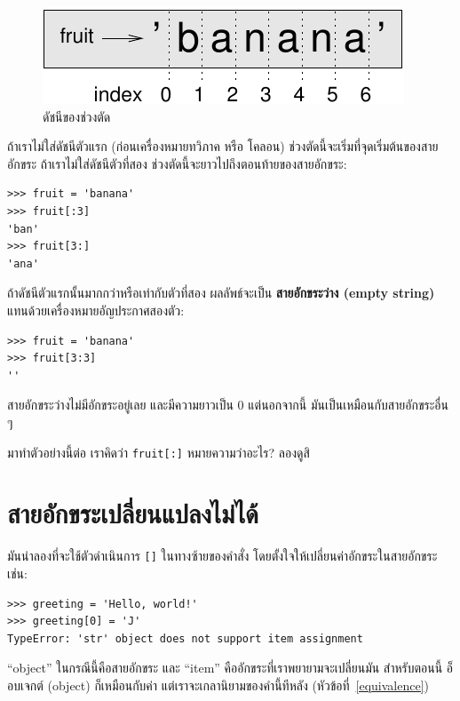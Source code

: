 \begin{figure}
\centerline
{\includegraphics[scale=0.8]{figs/banana.pdf}}
\caption{ดัชนีของช่วงตัด}
\label{fig.banana}
\end{figure}

ถ้าเราไม่ใส่ดัชนีตัวแรก (ก่อนเครื่องหมายทวิภาค หรือ โคลอน) ช่วงตัดนี้จะเริ่มที่จุดเริ่มต้นของสายอักขระ
ถ้าเราไม่ใส่ดัชนีตัวที่สอง ช่วงตัดนี้จะยาวไปถึงตอนท้ายของสายอักขระ:

\begin{verbatim}
>>> fruit = 'banana'
>>> fruit[:3]
'ban'
>>> fruit[3:]
'ana'
\end{verbatim}
%
ถ้าดัชนีตัวแรกนั้นมากกว่าหรือเท่ากับตัวที่สอง ผลลัพธ์จะเป็น {\bf สายอักขระว่าง (empty string)}
แทนด้วยเครื่องหมายอัญประกาศสองตัว:

\begin{verbatim}
>>> fruit = 'banana'
>>> fruit[3:3]
''
\end{verbatim}
%
สายอักขระว่างไม่มีอักขระอยู่เลย และมีความยาวเป็น 0 แต่นอกจากนี้ มันเป็นเหมือนกับสายอักขระอื่น ๆ

มาทำตัวอย่างนี้ต่อ เราคิดว่า {\tt fruit[:]} หมายความว่าอะไร?
ลองดูสิ



\section{สายอักขระเปลี่ยนแปลงไม่ได้} %

มันน่าลองที่จะใช้ตัวดำเนินการ {\tt []} ในทางซ้ายของคำสั่ง โดยตั้งใจให้เปลี่ยนค่าอักขระในสายอักขระ
เช่น:


\begin{verbatim}
>>> greeting = 'Hello, world!'
>>> greeting[0] = 'J'
TypeError: 'str' object does not support item assignment
\end{verbatim}
%
``object'' ในกรณีนี้คือสายอักขระ และ ``item'' คืออักขระที่เราพยายามจะเปลี่ยนมัน
สำหรับตอนนี้ อ็อบเจกต์ (object) ก็เหมือนกับค่า แต่เราจะเกลานิยามของคำนี้ทีหลัง (หัวข้อที่~\ref{equivalence}) 

